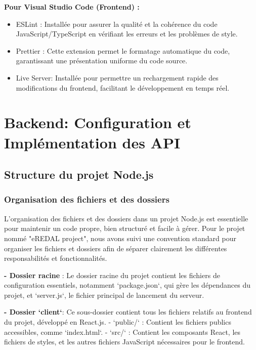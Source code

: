 \textbf{Pour Visual Studio Code (Frontend) :}
\begin{itemize}
 
\item ESLint : 
Installée pour assurer la qualité et la cohérence du code JavaScript/TypeScript en vérifiant les erreurs et les problèmes de style.
\item Prettier : 
Cette extension permet le formatage automatique du code, garantissant une présentation uniforme du code source.
\item Live Server:
Installée pour permettre un rechargement rapide des modifications du frontend, facilitant le développement en temps réel.
\end{itemize}











\section{Backend: Configuration et Implémentation des API}

\subsection{Structure du projet Node.js}


\subsubsection{ Organisation des fichiers et des dossiers}

L'organisation des fichiers et des dossiers dans un projet Node.js est essentielle pour maintenir un code propre, bien structuré et facile à gérer. Pour le projet nommé "eREDAL project", nous avons suivi une convention standard pour organiser les fichiers et dossiers afin de séparer clairement les différentes responsabilités et fonctionnalités.

\textbf{- Dossier racine} : Le dossier racine du projet contient les fichiers de configuration essentiels, notamment `package.json`, qui gère les dépendances du projet, et `server.js`, le fichier principal de lancement du serveur.

\textbf{- Dossier `client`}: Ce sous-dossier contient tous les fichiers relatifs au frontend du projet, développé en React.js. 
  - `public/` : Contient les fichiers publics accessibles, comme `index.html`.
  - `src/` : Contient les composants React, les fichiers de styles, et les autres fichiers JavaScript nécessaires pour le frontend.

